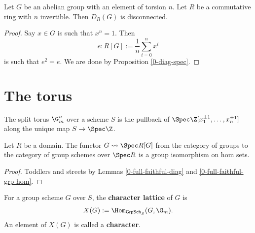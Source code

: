 \begin{proposition}
  \label{0-diag-tors}

  Let $G$ be an abelian group with an element of torsion $n$.
  Let $R$ be a commutative ring with $n$ invertible.
  Then $D_R(G)$ is disconnected.
\end{proposition}
\begin{proof}

  Say $x \in G$ is such that $x^n = 1$. Then
  \[e : R[G] := \frac 1n \sum_{i = 0}^n x^i\]
  is such that $e ^ 2 = e$.
  We are done by Proposition \ref{0-diag-spec}.
\end{proof}


\section{The torus}


\begin{definition}
  \label{0-torus}
  \leanok

  The split torus $\G_m^n$ over a scheme $S$ is the pullback of
  $\Spec \Z[x_1^{\pm 1}, \dotsc, x_n^{\pm 1}]$ along the unique map $S \to \Spec \Z$.
\end{definition}


\begin{lemma}
  \label{0-diag-hom}
  \leanok

  Let $R$ be a domain.
  The functor $G \rightsquigarrow \Spec R[G]$ from the category of groups to the category of group schemes over $\Spec R$ is a group isomorphism on hom sets.
\end{lemma}
\begin{proof}
  \leanok

  Toddlers and streets by Lemmas \ref{0-full-faithful-diag} and \ref{0-full-faithful-grp-hom}.
\end{proof}


\begin{definition}
  \label{0-char}
  \leanok

  For a group scheme $G$ over $S$, the {\bf character lattice} of $G$ is
  \[
    X(G) := \Hom_{\mathsf{GrpSch}_S}(G, \G_m).
  \]
  An element of $X(G)$ is called a {\bf character}.
\end{definition}


